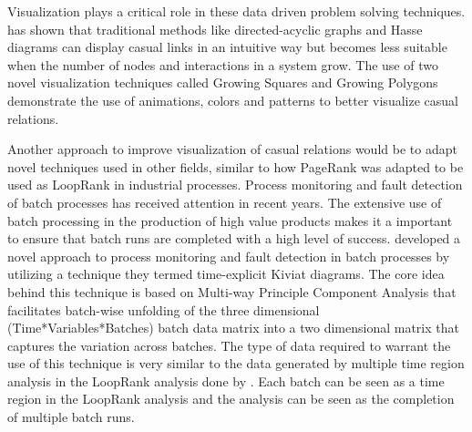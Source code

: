 Visualization plays a critical role in these data driven problem solving techniques. \cite{elmqvist2004animated} has shown that traditional methods like directed-acyclic graphs and Hasse diagrams can display casual links in an intuitive way but becomes less suitable when the number of nodes and interactions in a system grow. The use of two novel visualization techniques called Growing Squares and Growing Polygons demonstrate the use of animations, colors and patterns to better visualize casual relations.

Another approach to improve visualization of casual relations would be to adapt novel techniques used in other fields, similar to how PageRank was adapted to be used as LoopRank in industrial processes. Process monitoring and fault detection of batch processes has received attention in recent years. The extensive use of batch processing in the production of high value products makes it a important to ensure that batch runs are completed with a high level of success. \cite{wang2018geometric} developed a novel approach to process monitoring and fault detection in batch processes by utilizing a technique they termed time-explicit Kiviat diagrams. The core idea behind this technique is based on Multi-way Principle Component Analysis that facilitates batch-wise unfolding of the three dimensional (Time*Variables*Batches) batch data matrix into a two dimensional matrix that captures the variation across batches. The type of data required to warrant the use of this technique is very similar to the data generated by multiple time region analysis in the LoopRank analysis done by \cite{streicher2019plant}. Each batch can be seen as a time region in the LoopRank analysis and the analysis can be seen as the completion of multiple batch runs.

%

